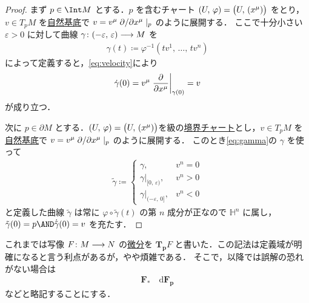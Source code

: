 \documentclass[geometry_main]{subfiles}
\begin{document}
\begin{proof}
	まず $p \in \Int M$ とする．$p$ を含む\cinfty チャート $(U,\, \varphi) = \bigl(U,\, (x^\mu)\bigr)$ をとり，$v \in T_p M$ を\hyperref[naturalbasis]{自然基底}で $v = v^\mu \pdv*{}{x^\mu}|_p$ のように展開する．
	ここで十分小さい $\varepsilon > 0$ に対して\cinfty 曲線 $\gamma \colon (-\varepsilon,\, \varepsilon) \longrightarrow M$ を
	\begin{align}
		\label{eq:gamma}
		\gamma(t) \coloneqq \varphi^{-1} (t v^1,\, \dots,\, tv^n)
	\end{align}
	によって定義すると，\eqref{eq:velocity}により
	\begin{align}
		\dot{\gamma}(0) = v^\mu \eval{\pdv{}{x^\mu}}_{\gamma(0)} = v
	\end{align}
	が成り立つ．

	次に $p \in \partial M$ とする．$(U,\, \varphi) = \bigl(U,\, (x^\mu)\bigr)$を\cinfty 級の\hyperref[def:int-manifold-with-boundary]{境界チャート}とし，$v \in T_p M$ を\hyperref[naturalbasis]{自然基底}で $v = v^\mu \pdv*{}{x^\mu}|_p$ のように展開する．
	このとき\eqref{eq:gamma}の $\gamma$ を使って
	\begin{align}
		\tilde{\gamma} \coloneqq
		\begin{cases}
			\gamma , &v^n = 0\\
			\gamma|_{[0,\, \varepsilon)}, &v^n > 0 \\
			\gamma|_{(-\varepsilon,\, 0]}, &v^n < 0 
		\end{cases}
	\end{align}
	と定義した\cinfty 曲線 $\tilde{\gamma}$ は常に $\varphi\circ \tilde{\gamma}(t)$ の第 $n$ 成分が正なので $\mathbb{H}^n$ に属し，$\tilde{\gamma} (0) = p \AND \dot{\tilde{\gamma}}(0) = v$ を充たす．
\end{proof}



\begin{marker}
	これまでは\cinfty 写像 $F \colon M \longrightarrow N$ の\hyperref[def:functor-Tp]{微分}を $\bm{T_p}F$ と書いた．この記法は定義域が明確になると言う利点があるが，やや煩雑である．
	そこで，以降では誤解の恐れがない場合は
	\begin{align}
		\bm{F_*}\quad \bm{\mathrm{d}F_p}
	\end{align}
	などと略記することにする．
\end{marker}

\end{document}
